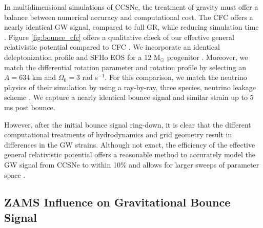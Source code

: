 \documentclass[twocolumn,times]{aastex62}  %
\newcommand{\Msun}{\ensuremath{\mathrm{M}_\odot}\xspace}
\begin{document}
In multidimensional simulations of CCSNe, the treatment of gravity must offer a balance between numerical accuracy and computational cost.   The CFC offers a nearly identical GW signal, compared to full GR, while reducing simulation time \citep{ott:2007}.  Figure \ref{fig:bounce_cfc} offers a qualitative check of our effective general relativistic potential compared to CFC \citep{richers:2017}.  We incorporate an identical deleptonization profile \citep{lieb:2005} and SFHo EOS \citep{steiner:2013} for a 12 \Msun progenitor \citep{woosley:2007}.  Moreover, we match the differential rotation parameter and rotation profile by selecting an $A = 634$ km and $\Omega_0 = 3$ rad s$^{-1}$.  For this comparison, we match the neutrino physics of their simulation by using a ray-by-ray, three species, neutrino leakage scheme \citep{oconnor:2010,couch:2014}.  We capture a nearly identical bounce signal and similar strain up to 5 ms post bounce. \par
However, after the initial bounce signal ring-down, it is clear that the different computational treatments of hydrodynamics and grid geometry result in differences in the GW strains.  Although not exact, the efficiency of the effective general relativistic potential offers a reasonable method to accurately model the GW signal from CCSNe to within 10\% and allows for larger sweeps of parameter space \citep{muller:2013}.




\subsection{ZAMS Influence on Gravitational Bounce Signal}

\end{document}
